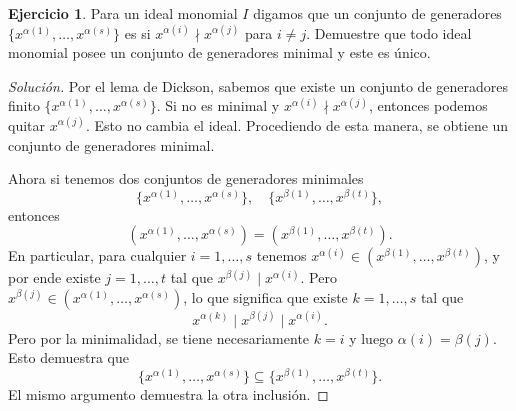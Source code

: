 \documentclass{article}
\theoremstyle{definition}
\newtheorem{ejerc}{Ejercicio}
\newenvironment{solucion}{\begin{proof}[Solución]}{\end{proof}}
\begin{document}
\begin{ejerc}
  Para un ideal monomial $I$ digamos que un conjunto de generadores
  $\{ x^{\alpha (1)}, \ldots, x^{\alpha (s)} \}$ es  si
  $x^{\alpha (i)} \nmid x^{\alpha (j)}$ para $i\ne j$. Demuestre que todo ideal
  monomial posee un conjunto de generadores minimal y este es único.

  \ifdefined\solutions\begin{solucion}
    Por el lema de Dickson, sabemos que existe un conjunto de generadores finito
    $\{ x^{\alpha (1)}, \ldots, x^{\alpha (s)} \}$. Si no es minimal y
    $x^{\alpha (i)} \nmid x^{\alpha (j)}$, entonces podemos quitar
    $x^{\alpha (j)}$. Esto no cambia el ideal. Procediendo de esta manera,
    se obtiene un conjunto de generadores minimal.

    Ahora si tenemos dos conjuntos de generadores minimales
    \[ \{ x^{\alpha (1)}, \ldots, x^{\alpha (s)} \}, \quad
       \{ x^{\beta (1)}, \ldots, x^{\beta (t)} \}, \]
    entonces
    \[ (x^{\alpha (1)}, \ldots, x^{\alpha (s)}) =
       (x^{\beta (1)}, \ldots, x^{\beta (t)}). \]
    En particular, para cualquier $i = 1,\ldots,s$ tenemos
    $x^{\alpha (i)} \in (x^{\beta (1)}, \ldots, x^{\beta (t)})$, y por ende
    existe $j = 1,\ldots,t$ tal que $x^{\beta (j)} \mid x^{\alpha (i)}$. Pero
    $x^{\beta (j)} \in (x^{\alpha (1)}, \ldots, x^{\alpha (s)})$, lo que
    significa que existe $k = 1,\ldots,s$ tal que
    $$x^{\alpha (k)} \mid x^{\beta (j)} \mid x^{\alpha (i)}.$$
    Pero por la minimalidad, se tiene necesariamente $k = i$ y luego
    $\alpha (i) = \beta (j)$. Esto demuestra que
    \[ \{ x^{\alpha (1)}, \ldots, x^{\alpha (s)} \} \subseteq
       \{ x^{\beta (1)}, \ldots, x^{\beta (t)} \}. \]
    El mismo argumento demuestra la otra inclusión.
  \end{solucion}\fi
\end{ejerc}
\end{document}
